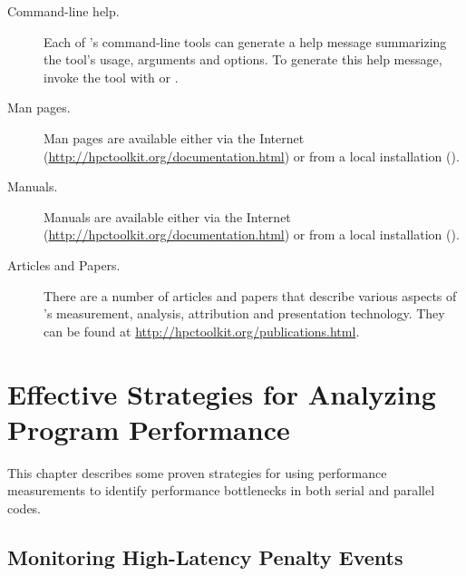 \documentclass[11pt,twoside,letterpaper]{report}
\begin{document}
\begin{description}

\item[Command-line help.]\hfill

Each of \HPCToolkit{}'s command-line tools can generate a help message summarizing the tool's usage, arguments and options.
To generate this help message, invoke the tool with  or .

\item[Man pages.]\hfill

Man pages are available either via the Internet (\url{http://hpctoolkit.org/documentation.html}) or from a local \HPCToolkit{} installation ().

\item[Manuals.]\hfill

Manuals are available either via the Internet (\url{http://hpctoolkit.org/documentation.html}) or from a local \HPCToolkit{} installation ().

\item[Articles and Papers.]\hfill

There are a number of articles and papers that describe various aspects of \HPCToolkit{}'s measurement, analysis, attribution and presentation technology.
They can be found at \url{http://hpctoolkit.org/publications.html}.

\end{description}



\cleardoublepage
\chapter{Effective Strategies for Analyzing Program Performance}
\label{chpt:effective-performance-analysis}

This chapter describes some proven strategies for using performance measurements to identify performance bottlenecks in both serial and parallel codes.



\section{Monitoring High-Latency Penalty Events}
\label{sec:effective-performance-analysis:penalty-events}
\end{document}

